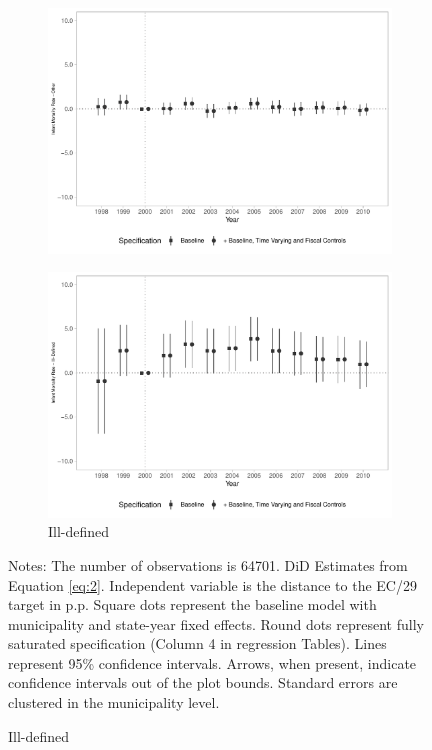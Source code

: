 \begin{figure}[h!]
\begin{center}
\begin{subfigure}{0.32\textwidth}
        \includegraphics[width=\textwidth]{plots/tx_mi_out_dist_ec29_baseline_dist_ec29_baseline_18.pdf}
    \end{subfigure}
        \begin{subfigure}{0.32\textwidth}
        \centering
        \caption{\scriptsize Ill-defined}\label{fig:18h}
        \includegraphics[width=\textwidth]{plots/tx_mi_illdef_dist_ec29_baseline_dist_ec29_baseline_18.pdf}
    \end{subfigure}
    \end{center}
    
            \scriptsize{Notes: The number of observations is 64701. DiD Estimates from Equation \ref{eq:2}. Independent variable is the distance to the EC/29 target in p.p. Square dots represent the baseline model with municipality and state-year fixed effects. Round dots represent fully saturated specification (Column 4 in regression Tables). Lines represent 95\% confidence intervals. Arrows, when present, indicate confidence intervals out of the plot bounds. Standard errors are clustered in the municipality level.}
    
\end{figure}